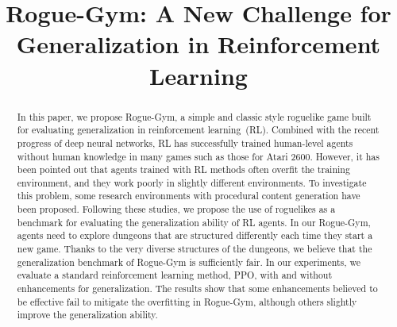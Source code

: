 \documentclass[conference]{IEEEtran}
\newcommand\pcg{procedural content generation} %
\begin{document}
\title{Rogue-Gym: A New Challenge for Generalization in Reinforcement Learning
}

\author{
\and
{}
}
\maketitle
\begin{abstract}
 In this paper, we propose Rogue-Gym, a simple and classic style roguelike
 game built for evaluating generalization in reinforcement
 learning~(RL).
 Combined with the recent progress of deep neural networks, RL has
 successfully trained human-level agents without human knowledge in many
 games such as those for Atari 2600.
 However, it has been pointed out that agents trained with RL methods
 often overfit the training environment, and they work poorly in slightly
 different environments.
 To investigate this problem, some research environments with \pcg{}
 have been proposed.
 Following these studies, we propose the use of roguelikes as a
 benchmark for evaluating the generalization ability of RL agents.
 In our Rogue-Gym, agents need to explore dungeons that are
 structured differently each time they start a new game.
 Thanks to the very diverse structures of the dungeons, we believe that
 the generalization benchmark of Rogue-Gym is sufficiently fair.
 In our experiments, we evaluate a standard reinforcement learning
 method, PPO, with and without enhancements for generalization.
 The results show that some enhancements believed to be effective fail to
 mitigate the overfitting in Rogue-Gym, although others slightly
 improve the generalization ability.
\end{abstract}
\end{document}

